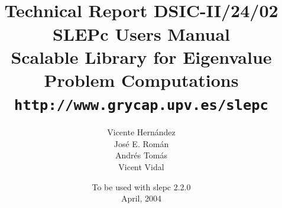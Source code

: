 \documentclass[titlepage,10pt,a4paper]{slepc}
\newcommand{\slepcversion}{2.2.0}
\newcommand{\packnoi}[1]{{\sc #1}\xspace}
\newcommand{\slepc}{\packnoi{slep\rm c}}
\newcommand{\slepchome}{http://www.grycap.upv.es/slepc}
\newcommand{\url}[1]{\texttt{#1}}
\begin{document}
\title{
 	\vspace*{-1cm}
	\\[2cm]
	\normalsize Technical Report DSIC-II/24/02
	\\[2cm]
	\vspace*{6mm}
	{\Large\bf\sffamily 
	SLEPc Users Manual\\[2mm]}
	{\large\bf\sffamily 
	Scalable Library for Eigenvalue Problem Computations}\\[2mm]
	\vspace*{6mm}
	\vspace*{6mm}
	\url{\slepchome}
	\\[6mm]
}

\author{
	Vicente Hern\'andez
	\\
	Jos\'e E. Rom\'an
	\\
	Andr\'es Tom\'as
	\\
	Vicent Vidal
	\\[2cm]
}

\date{
	To be used with \slepc \slepcversion\\
	April, 2004
}

{
\pagestyle{empty}
\maketitle
}

\setlength{\textheight}{14.99cm}
\setlength{\footskip}{2cm}
\setlength{\voffset}{2.3cm}

\pagestyle{empty}
\cleardoublepage
\end{document}

